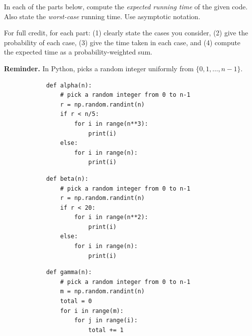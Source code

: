\begin{prob}
    In each of the parts below, compute the \emph{expected running time} of the
    given code. Also state the \emph{worst-case} running time. Use asymptotic
    notation.
    
    For full credit, for each part:
    (1) clearly state the cases you consider,
    (2) give the probability of each case,
    (3) give the time taken in each case, and
    (4) compute the expected time as a probability-weighted sum.
    
    \textbf{Reminder.} In Python,  picks a random
    integer uniformly from $\{0,1,\ldots,n-1\}$.
    
    \begin{subprobset}
    
    \begin{subprob}
        \begin{verbatim}
            def alpha(n):
                # pick a random integer from 0 to n-1
                r = np.random.randint(n)
                if r < n/5:
                    for i in range(n**3):
                        print(i)
                else:
                    for i in range(n):
                        print(i)
        \end{verbatim}
    \end{subprob}
    
    \begin{subprob}
        \begin{verbatim}
            def beta(n):
                # pick a random integer from 0 to n-1
                r = np.random.randint(n)
                if r < 20:
                    for i in range(n**2):
                        print(i)
                else:
                    for i in range(n):
                        print(i)
        \end{verbatim}
    \end{subprob}
    
    \begin{subprob}
        \begin{verbatim}
            def gamma(n):
                # pick a random integer from 0 to n-1
                m = np.random.randint(n)
                total = 0
                for i in range(m):
                    for j in range(i):
                        total += 1
        \end{verbatim}
    \end{subprob}
    

\end{subprobset}
\end{prob}
